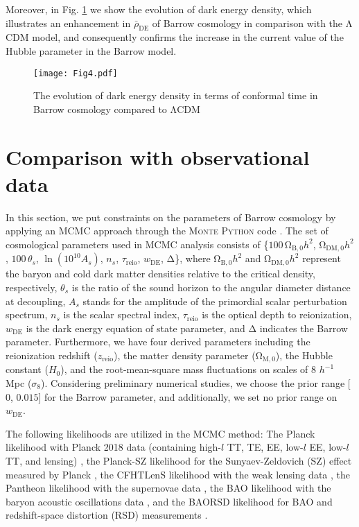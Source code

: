 \documentclass[11pt,twocolumn]{article}
\begin{document}
Moreover, in Fig. \ref{f4} we show the evolution of dark energy density, which illustrates an enhancement in $\bar{\rho}_\mathrm{DE}$ of Barrow cosmology in comparison with the $\mathrm{\Lambda}$CDM model, and consequently confirms the increase in the current value of the Hubble parameter in the Barrow model.
    \begin{figure}[ht!]
    	\centering
    	\texttt{[image: Fig4.pdf]}
    	\caption{The evolution of dark energy density in terms of conformal time in Barrow cosmology compared to $\mathrm{\Lambda}$CDM}
    	\label{f4}
    \end{figure} 
\section{Comparison with observational data} \label{sec4}
In this section, we put constraints on the parameters of Barrow cosmology
by applying an MCMC approach through the M\textsc{onte} P\textsc{ython} code \cite{mp1,mp2}.
The set of cosmological parameters used in MCMC analysis consists of
\{$100\,\mathrm{\Omega}_{\mathrm{B},0} h^2$, $\mathrm{\Omega}_{\mathrm{DM},0} h^2$, $100\,\theta_s$,
$\ln (10^{10} A_s)$, $n_s$, $\tau_{\mathrm{reio}}$, $w_\mathrm{DE}$, $\mathrm{\Delta}$\},
where $\mathrm{\Omega}_{\mathrm{B},0} h^2$ and $\mathrm{\Omega}_{\mathrm{DM},0} h^2$
represent the baryon and cold dark matter densities relative to
the critical density, respectively, $\theta_s$ is the ratio of the
sound horizon to the angular diameter distance at decoupling,
$A_s$ stands for the amplitude of the primordial scalar
perturbation spectrum, $n_s$ is the scalar spectral index,
$\tau_{\mathrm{reio}}$ is the optical depth to reionization,
$w_\mathrm{DE}$ is the dark energy equation of state parameter,
and $\mathrm{\Delta}$ indicates the Barrow parameter. Furthermore, we have
four derived parameters including the reionization redshift
($z_\mathrm{reio}$), the matter density parameter
($\mathrm{\Omega}_{\mathrm{M},0}$), the Hubble constant ($H_0$), and the
root-mean-square mass fluctuations on scales of 8 $h^{-1}$ Mpc
($\sigma_8$). Considering preliminary numerical studies, we choose
the prior range [$0$, $0.015$] for the Barrow parameter, and
additionally, we set no prior range on $w_\mathrm{DE}$.

The following likelihoods are utilized in the MCMC method: The Planck
likelihood with Planck 2018 data (containing high-$l$ TT, TE, EE,
low-$l$ EE, low-$l$ TT, and lensing) \cite{p18}, the Planck-SZ
likelihood for the Sunyaev-Zeldovich (SZ) effect measured by Planck
\cite{sz1,sz2}, the CFHTLenS likelihood with the weak lensing data
\cite{lens1,lens2}, the Pantheon likelihood with the supernovae data
\cite{pan}, the BAO likelihood with the baryon acoustic
oscillations data \cite{bao1,bao2}, and the BAORSD likelihood for
BAO and redshift-space distortion (RSD) measurements
\cite{rsd1,rsd2}.
\end{document}
